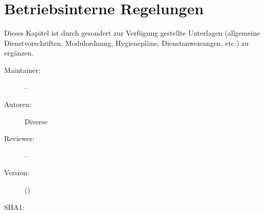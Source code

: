 \def\ChapterCode{BET}
\chapter
[\CO{[BET]} Betriebsinterne Regelungen]
{Betriebsinterne Regelungen}
\label{chp:BET}

\ChapterIntro
{%
Dieses Kapitel ist durch gesondert zur Verfügung gestellte
Unterlagen (allgemeine Dienstvorschriften, Modulordnung,
Hygienepläne, Dienstanweisungen, etc.) zu ergänzen.
}
{%
\begin{description}
  \item[Maintainer:] --
  \item[Autoren:] Diverse
  \item[Reviewer:] --
  \item[Version:] {\DocVersion} ({\DocVersionInfo})
  \item[SHA1:] {\DocGitCommit}
\end{description}

{\TxTeilkapitelAASS}
}



\ChapterEnd